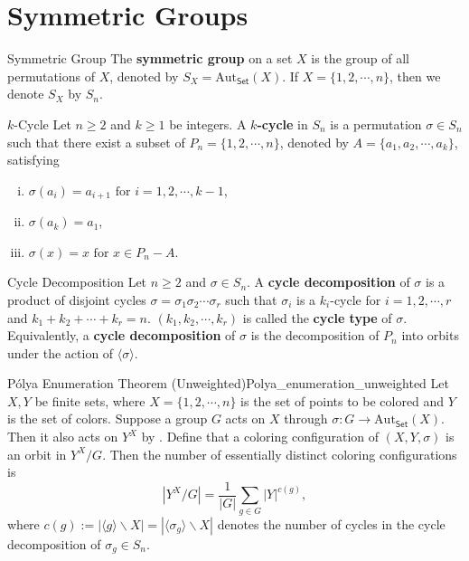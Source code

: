 \section{Symmetric Groups}

\begin{definition}{Symmetric Group}{}
    The \textbf{symmetric group} on a set $X$ is the group of all permutations of $X$, denoted by $S_X=\mathrm{Aut}_{\mathsf{Set}}(X)$. If $X=\{1,2,\cdots,n\}$, then we denote $S_X$ by $S_n$.
\end{definition}

\begin{definition}{$k$-Cycle}{}
    Let $n\ge 2$ and $k\ge 1$ be integers. A \textbf{$k$-cycle} in $S_n$ is a permutation $\sigma\in S_n$ such that there exist a subset of $P_n=\{1,2,\cdots,n\}$, denoted by $A=\{a_1,a_2,\cdots,a_k\}$, satisfying
    \begin{enumerate}[(i)]
        \item $\sigma(a_i)=a_{i+1}\text{ for }i=1,2,\cdots,k-1$,
        \item $\sigma(a_k)=a_1$,
        \item $\sigma(x)=x\text{ for }x\in P_n-A$.
    \end{enumerate}
\end{definition}

\begin{definition}{Cycle Decomposition}{}
    Let $n\ge 2$ and $\sigma\in S_n$. A \textbf{cycle decomposition} of $\sigma$ is a product of disjoint cycles $\sigma=\sigma_1\sigma_2\cdots\sigma_r$ such that $\sigma_i$ is a $k_i$-cycle for $i=1,2,\cdots,r$ and $k_1+k_2+\cdots+k_r=n$. $(k_1,k_2,\cdots,k_r)$ is called the \textbf{cycle type} of $\sigma$. Equivalently, a \textbf{cycle decomposition} of $\sigma$ is the decomposition of $P_n$ into orbits under the action of $\langle\sigma\rangle$.
\end{definition}


\begin{theorem}{Pólya Enumeration Theorem (Unweighted)}{Polya_enumeration_unweighted}
    Let $X, Y$ be finite sets, where $X=\{1,2,\cdots,n\}$ is the set of points to be colored and $Y$ is the set of colors. Suppose a group $G$ acts on $X$ through $\sigma:G\to\mathrm{Aut}_{\mathsf{Set}}(X)$. Then it also acts on $Y^X$ by . Define that a coloring configuration of $(X,Y,\sigma)$ is an orbit in $Y^X/G$. Then the number of essentially distinct coloring configurations is
    $$
        \left|Y^X / G\right|=\frac{1}{|G|} \sum_{g \in G}|Y|^{c(g)},
    $$
    where $c(g):=\left|\langle g\rangle \backslash X\right|=\left|\langle \sigma_g\rangle \backslash X\right|$ denotes the number of cycles in the cycle decomposition of $\sigma_g \in S_n$.
\end{theorem}

